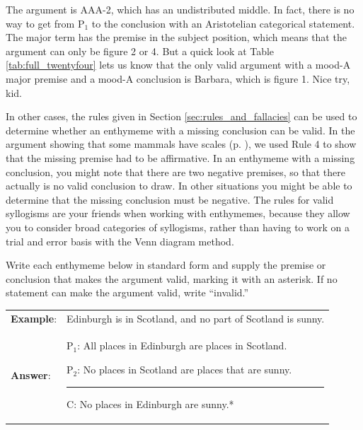 {The argument is AAA-2, which has an undistributed middle. In fact, there is no way to get from P$_1$ to the conclusion with an Aristotelian categorical statement. The major term has the premise in the subject position, which means that the argument can only be figure 2 or 4. But a quick look at Table \ref{tab:full_twentyfour} lets us know that the only valid argument with a mood-A major premise and a mood-A conclusion is Barbara, which is figure 1. Nice try, kid. 

In other cases, the rules given in Section \ref{sec:rules_and_fallacies} can be used to determine whether an enthymeme with a missing conclusion can be valid. In the argument showing that some mammals have scales (p. \pageref{rule_use}), we used Rule 4 to show that the missing premise had to be affirmative. In an enthymeme with a missing conclusion, you might note that there are two negative premises, so that there actually is no valid conclusion to draw. In other situations you might be able to determine that the missing conclusion must be negative. The rules for valid syllogisms are your friends when working with enthymemes, because they allow you to consider broad categories of syllogisms, rather than having to work on a trial and error basis with the Venn diagram method.

\practiceproblems
\noindent \problempart Write each enthymeme below in standard form and supply the premise or conclusion that makes the argument valid, marking it with an asterisk. If no statement can make the argument valid, write ``invalid.''

\begin{longtabu}{p{.1\linewidth}p{.9\linewidth}}
\textbf{Example}: & Edinburgh is in Scotland, and no part of Scotland is sunny. \\
\textbf{Answer}: & 
\vspace{-16pt}
\begin{earg}
\item[P$_1$:] All places in Edinburgh are places in Scotland.
\item[P$_2$:] No places in Scotland are places that are sunny.
\vspace{-.5em}
\item [] \rule{0.6\linewidth}{.5pt} 
\item[C:] No places in Edinburgh are sunny.* 
\end{earg} 
\end{longtabu}



}
